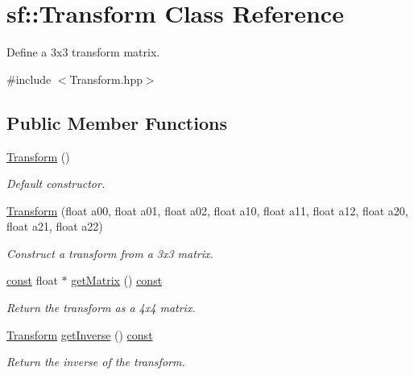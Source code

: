 \hypertarget{classsf_1_1_transform}{\section{sf\-:\-:Transform Class Reference}
\label{classsf_1_1_transform}
}


Define a 3x3 transform matrix.  




{\ttfamily \#include $<$Transform.\-hpp$>$}

\subsection*{Public Member Functions}
\begin{DoxyCompactItemize}
\item 
\hyperlink{classsf_1_1_transform_ac32de51bd0b9f3d52fbe0838225ee83b}{Transform} ()
\begin{DoxyCompactList}\small\item\em Default constructor. \end{DoxyCompactList}\item 
\hyperlink{classsf_1_1_transform_a78c48677712fcf41122d02f1301d71a3}{Transform} (float a00, float a01, float a02, float a10, float a11, float a12, float a20, float a21, float a22)
\begin{DoxyCompactList}\small\item\em Construct a transform from a 3x3 matrix. \end{DoxyCompactList}\item 
\hyperlink{term__entry_8h_a57bd63ce7f9a353488880e3de6692d5a}{const} float $\ast$ \hyperlink{classsf_1_1_transform_ae4c1969c47533e2b01deb526ff73b37f}{get\-Matrix} () \hyperlink{term__entry_8h_a57bd63ce7f9a353488880e3de6692d5a}{const} 
\begin{DoxyCompactList}\small\item\em Return the transform as a 4x4 matrix. \end{DoxyCompactList}\item 
\hyperlink{classsf_1_1_transform}{Transform} \hyperlink{classsf_1_1_transform_ab1c033198b0aae8cdb9daa3d3bef3fc1}{get\-Inverse} () \hyperlink{term__entry_8h_a57bd63ce7f9a353488880e3de6692d5a}{const} 
\begin{DoxyCompactList}\small\item\em Return the inverse of the transform. \end{DoxyCompactList}\item 

\end{DoxyCompactItemize}
